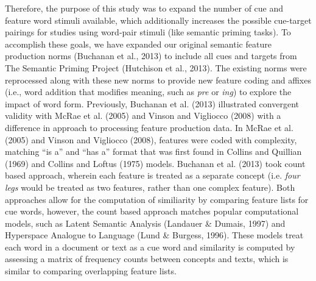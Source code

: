 \documentclass[english,,man]{apa6}
\theoremstyle{definition}
\theoremstyle{definition}
\theoremstyle{definition}
\theoremstyle{remark}
\begin{document}
Therefore, the purpose of this study was to expand the number of cue and
feature word stimuli available, which additionally increases the
possible cue-target pairings for studies using word-pair stimuli (like
semantic priming tasks). To accomplish these goals, we have expanded our
original semantic feature production norms (Buchanan et al., 2013) to
include all cues and targets from The Semantic Priming Project
(Hutchison et al., 2013). The existing norms were reprocessed along with
these new norms to provide new feature coding and affixes (i.e., word
addition that modifies meaning, such as \emph{pre} or \emph{ing}) to
explore the impact of word form. Previously, Buchanan et al. (2013)
illustrated convergent validity with McRae et al. (2005) and Vinson and
Vigliocco (2008) with a difference in approach to processing feature
production data. In McRae et al. (2005) and Vinson and Vigliocco (2008),
features were coded with complexity, matching \enquote{is a} and
\enquote{has a} format that was first found in Collins and Quillian
(1969) and Collins and Loftus (1975) models. Buchanan et al. (2013) took
count based approach, wherein each feature is treated as a separate
concept (i.e. \emph{four legs} would be treated as two features, rather
than one complex feature). Both approaches allow for the computation of
similiarity by comparing feature lists for cue words, however, the count
based approach matches popular computational models, such as Latent
Semantic Analysis (Landauer \& Dumais, 1997) and Hyperspace Analogue to
Language (Lund \& Burgess, 1996). These models treat each word in a
document or text as a cue word and similarity is computed by assessing a
matrix of frequency counts between concepts and texts, which is similar
to comparing overlapping feature lists.
\end{document}
